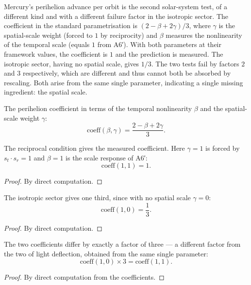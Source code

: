 Mercury's perihelion advance per orbit is the second solar-system test, of a different kind and with a different failure factor in the isotropic sector. The coefficient in the standard parametrisation is $(2 - \beta + 2\gamma)/3$, where $\gamma$ is the spatial-scale weight (forced to $1$ by reciprocity) and $\beta$ measures the nonlinearity of the temporal scale (equals $1$ from A6′). With both parameters at their framework values, the coefficient is $1$ and the prediction is measured. The isotropic sector, having no spatial scale, gives $1/3$. The two tests fail by factors $2$ and $3$ respectively, which are different and thus cannot both be absorbed by rescaling. Both arise from the same single parameter, indicating a single missing ingredient: the spatial scale.

\begin{definition}
The perihelion coefficient in terms of the temporal nonlinearity $\beta$ and the spatial-scale weight $\gamma$:
\[
\text{coeff}(\beta, \gamma) = \frac{2 - \beta + 2\gamma}{3}.
\]
\end{definition}

\begin{theorem}
The reciprocal condition gives the measured coefficient. Here $\gamma = 1$ is forced by $s_t \cdot s_r = 1$ and $\beta = 1$ is the scale response of A6′:
\[
\text{coeff}(1, 1) = 1.
\]
\begin{proof}
By direct computation.
\end{proof}
\end{theorem}

\begin{theorem}
The isotropic sector gives one third, since with no spatial scale $\gamma = 0$:
\[
\text{coeff}(1, 0) = \frac{1}{3}.
\]
\begin{proof}
By direct computation.
\end{proof}
\end{theorem}

\begin{theorem}
The two coefficients differ by exactly a factor of three — a different factor from the two of light deflection, obtained from the same single parameter:
\[
\text{coeff}(1, 0) \times 3 = \text{coeff}(1, 1).
\]
\begin{proof}
By direct computation from the coefficients.
\end{proof}
\end{theorem}

